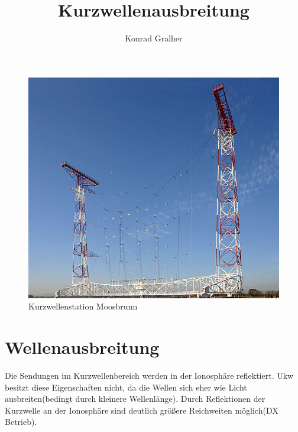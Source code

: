 \documentclass[fontzize=12pt,paper=a4,twoside=false]{article}
\title{Kurzwellenausbreitung}
\author{Konrad Gralher}
\begin{document}
\begin{titlepage}
    \bfseries\Huge{}    
    \begin{figure}
        \includegraphics[]{assets/640px-Moosbrunn_SW_Antenna}
        \caption{Kurzwellenstation Moosbrunn}  
    \end{figure}        
\end{titlepage}

\part[]{Wellenausbreitung}

Die Sendungen im Kurzwellenbereich werden in der Ionosphäre reflektiert. 
Ukw besitzt diese Eigenschaften nicht, da die Wellen sich eher wie Licht ausbreiten(bedingt durch kleinere Wellenlänge). Durch Reflektionen der Kurzwelle an der Ionosphäre
sind deutlich größere Reichweiten möglich(DX Betrieb).
\vspace{0.1cm}
\end{document}
